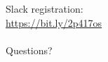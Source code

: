 \documentclass{beamer}
\begin{document}
	\begin{frame}
		\huge
		\begin{center}
			Slack registration: \\
			\url{https://bit.ly/2p417os} \\ \ \\
	
	
			Questions?		
		\end{center}
		\large
		

		
		
	\end{frame}
	
\end{document}
